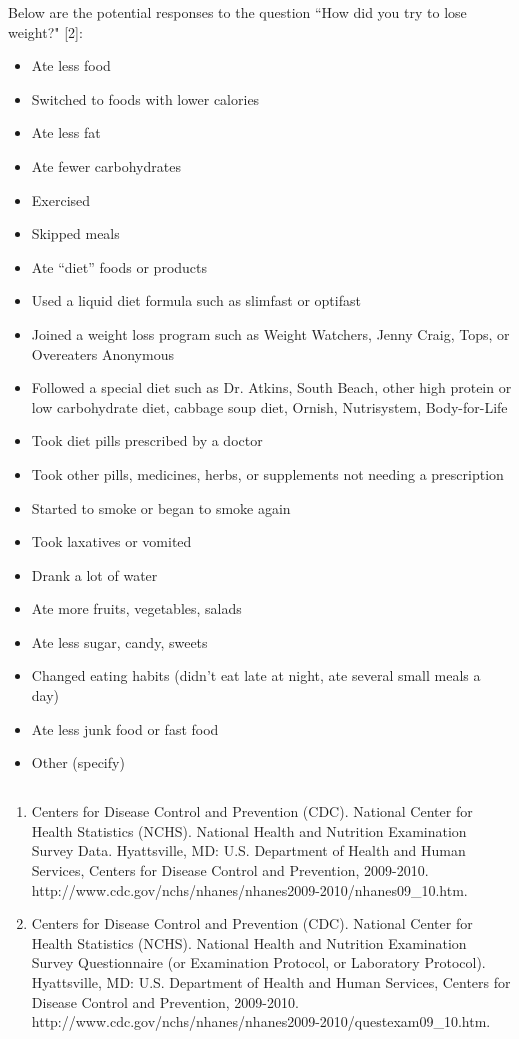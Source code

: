 \documentclass{article}
\begin{document}
Below are the potential responses to the question ``How did you try to lose weight?" [2]:

\begin{itemize}[noitemsep]
\item Ate less food
\item Switched to foods with lower calories
\item Ate less fat
\item Ate fewer carbohydrates
\item Exercised
\item Skipped meals
\item Ate ``diet'' foods or products
\item Used a liquid diet formula such as slimfast or optifast
\item Joined a weight loss program such as Weight Watchers, Jenny Craig, Tops, or Overeaters Anonymous
\item Followed a special diet such as Dr. Atkins, South Beach, other high protein or low carbohydrate diet, cabbage soup diet, Ornish, Nutrisystem, Body-for-Life
\item Took diet pills prescribed by a doctor
\item Took other pills, medicines, herbs, or supplements not needing a prescription
\item Started to smoke or began to smoke again
\item Took laxatives or vomited
\item Drank a lot of water
\item Ate more fruits, vegetables, salads
\item Ate less sugar, candy, sweets
\item Changed eating habits (didn't eat late at night, ate several small meals a day)
\item Ate less junk food or fast food
\item Other (specify)
\end{itemize}

\subsection*{}
\begin{enumerate}
	\item Centers for Disease Control and Prevention (CDC). National Center for Health Statistics (NCHS). National Health and Nutrition Examination Survey Data. Hyattsville, MD: U.S. Department of Health and Human Services, Centers for Disease Control and Prevention, 2009-2010. \\ http://www.cdc.gov/nchs/nhanes/nhanes2009-2010/nhanes09\_10.htm.
	\item Centers for Disease Control and Prevention (CDC). National Center for Health Statistics (NCHS). National Health and Nutrition Examination Survey Questionnaire (or Examination Protocol, or Laboratory Protocol). Hyattsville, MD: U.S. Department of Health and Human Services, Centers for Disease Control and Prevention, 2009-2010. \\ http://www.cdc.gov/nchs/nhanes/nhanes2009-2010/questexam09\_10.htm.
\end{enumerate}
\end{document}
